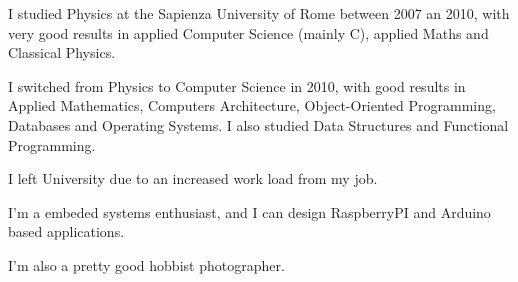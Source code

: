 \documentclass[10pt,a4paper]{altacv}
\begin{document}
I studied Physics at the Sapienza University of Rome between 2007 an 2010, with very good results in applied Computer Science (mainly C), applied Maths and Classical Physics.

\smallskip

I switched from Physics to Computer Science in 2010, with good results in Applied Mathematics, Computers Architecture, Object-Oriented Programming, Databases and Operating Systems. I also studied Data Structures and Functional Programming.

\smallskip

I left University due to an increased work load from my job.

I'm a embeded systems enthusiast, and I can design RaspberryPI and Arduino based applications.

\smallskip

I'm also a pretty good hobbist photographer.
\end{document}
